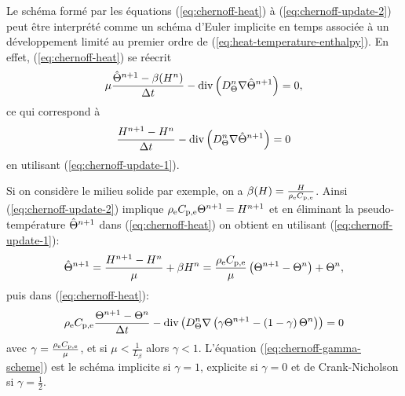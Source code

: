 \begin{remarque}
  Le schéma formé par les équations (\ref{eq:chernoff-heat}) à
  (\ref{eq:chernoff-update-2}) peut être interprété comme un
  schéma d'Euler implicite en temps associée à un développement
  limité au premier ordre de (\ref{eq:heat-temperature-enthalpy}). En
  effet, (\ref{eq:chernoff-heat}) se réecrit
  \begin{equation}
    \mu \frac{\hat{\Theta}^{n+1} - \beta(H^n)}{\Delta t} -
    \mathrm{div}\left( D_\Theta^n \nabla \hat{\Theta}^{n+1} \right) = 0,
  \end{equation}
  ce qui correspond à
  \begin{equation}
    \frac{H^{n+1} - H^n}{\Delta t} -
    \mathrm{div}\left( D_\Theta^n \nabla \hat{\Theta}^{n+1} \right) = 0
  \end{equation}
  en utilisant (\ref{eq:chernoff-update-1}).
\end{remarque}

\begin{remarque}
Si on considère le milieu solide par exemple, on a
$\beta(H) =
\frac{H}{\rho_\mathrm{e}C_{\mathrm{p,e}}}$. Ainsi
(\ref{eq:chernoff-update-2}) implique
$\rho_\mathrm{e}C_{\mathrm{p,e}}\Theta^{n+1} =
H^{n+1}$ et en éliminant la pseudo-température
$\hat{\Theta}^{n+1}$ dans (\ref{eq:chernoff-heat}) on obtient en
utilisant (\ref{eq:chernoff-update-1}):
\begin{equation}
  \hat{\Theta}^{n+1} = \frac{H^{n+1} -
    H^n}{\mu} + \beta{H^n} =
  \frac{\rho_\mathrm{e}
    C_{\mathrm{p,e}}}{\mu}\left( \Theta^{n+1} - \Theta^{n} \right)
  + \Theta^{n},
\end{equation}
puis dans (\ref{eq:chernoff-heat}):
\begin{equation}
\rho_\mathrm{e} C_{\mathrm{p,e}} \frac{\Theta^{n+1} -
  \Theta^{n}}{\Delta t} - \mathrm{div}\left( D_\Theta^n
  \nabla\left( \gamma \Theta^{n+1} - \left( 1 -
      \gamma \right)\Theta^n \right) \right) = 0 \label{eq:chernoff-gamma-scheme}
\end{equation}
avec $\gamma = \frac{\rho_\mathrm{e} C_{\mathrm{p,e}}}{\mu}$, et si
$\mu < \frac{1}{L_\beta}$ alors $\gamma < 1$.
L'équation (\ref{eq:chernoff-gamma-scheme}) est le schéma implicite
si $\gamma = 1$, explicite si $\gamma = 0$ et de Crank-Nicholson si
$\gamma = \frac{1}{2}$.
\end{remarque}

